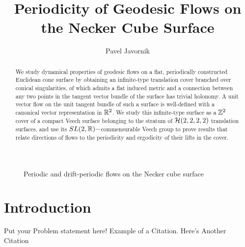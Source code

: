 \documentclass[]{article}
\begin{document}
\newtheorem{thm}{Theorem}[]
\newtheorem{Def}{Definition}[]
\newtheorem*{thm*}{Theorem}
\newtheorem*{def*}{Definition}
\newtheorem{lem}{Lemma}
\newtheorem*{rem}{Remark}
\newcommand{\shiftleft}[2]{\makebox[0pt][r]{\makebox[#1][l]{#2}}}
\newtheorem*{conj}{Conjecture}
\newtheorem{cor}{Corollary}[]

\newcommand{\compav}[1]{\textbf{\textcolor{blue}{#1}}}
\newcommand{\compat}[1]{\textbf{\textcolor{red}{#1}}}
\graphicspath{{images/}}



\title{Periodicity of Geodesic Flows on the Necker Cube Surface}
\author{Pavel Javornik}

\maketitle

%

\begin{abstract}
We study dynamical properties of geodesic flows on a flat, periodically constructed Euclidean cone surface by obtaining an infinite-type translation cover branched over conical singularities, of which admits a flat induced metric and a connection between any two points in the tangent vector bundle of the surface has trivial holonomy. A unit vector flow on the unit tangent bundle of such a surface is well-defined with a canonical vector representation in $\mathbb{R}^2$. We study this infinite-type surface as a $\mathbb{Z}^2$ cover of a compact Veech surface belonging to the stratum of $\mathcal{H}(2,2,2,2)$ translation surfaces, and use its $SL(2,\mathbb{R})-$commensurable Veech group to prove results that relate directions of flows to the periodicity and ergodicity of their lifts in the cover.
\end{abstract}
\begin{figure}[H]
\centering

\label{fig:front}
\caption{Periodic and drift-periodic flows on the Necker cube surface}
\end{figure}


\newpage
\section{Introduction}

Put your Problem statement here! Example of a Citation\cite[p.219]{Robotics}. Here's Another Citation \cite{Flueck}
\end{document}
